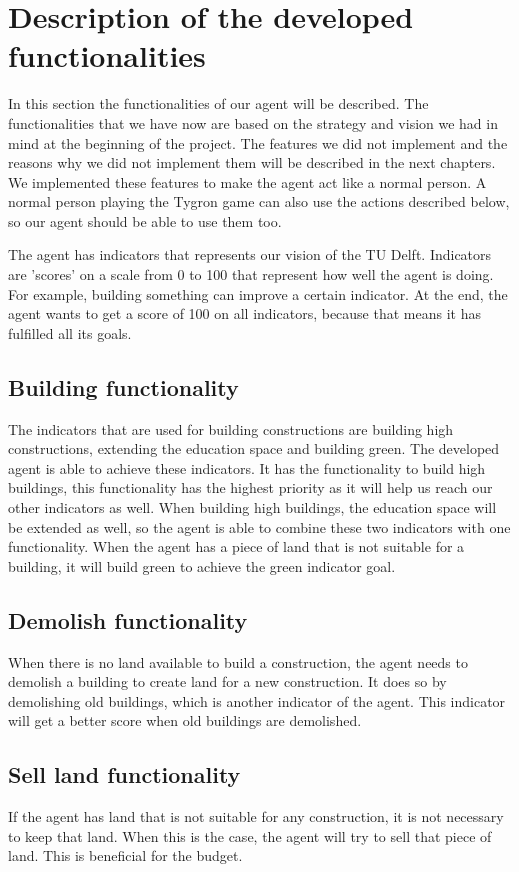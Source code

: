 \chapter{Description of the developed functionalities}
In this section the functionalities of our agent will be described.
The functionalities that we have now are based on the strategy and vision we had in mind at the beginning of the project.
The features we did not implement and the reasons why we did not implement them will be described in the next chapters. 
We implemented these features to make the agent act like a normal person.
A normal person playing the Tygron game can also use the actions described below, so our agent should be able to use them too.

The agent has indicators that represents our vision of the TU Delft.
Indicators are 'scores' on a scale from 0 to 100 that represent how well the agent is doing.
For example, building something can improve a certain indicator.
At the end, the agent wants to get a score of 100 on all indicators, because that means it has fulfilled all its goals.

\section{Building functionality}
The indicators that are used for building constructions are building high constructions, extending the education space and building green.
The developed agent is able to achieve these indicators. 
It has the functionality to build high buildings, this functionality has the highest priority as it will help us reach our other indicators as well.
When building high buildings, the education space will be extended as well, so the agent is able to combine these two indicators with one functionality.
When the agent has a piece of land that is not suitable for a building, it will build green to achieve the green indicator goal.

\section{Demolish functionality}
When there is no land available to build a construction, the agent needs to demolish a building to create land for a new construction.
It does so by demolishing old buildings, which is another indicator of the agent.
This indicator will get a better score when old buildings are demolished.

\section{Sell land functionality}
If the agent has land that is not suitable for any construction, it is not necessary to keep that land. When this is the case, the agent will try to sell that piece of land. This is beneficial for the budget.

